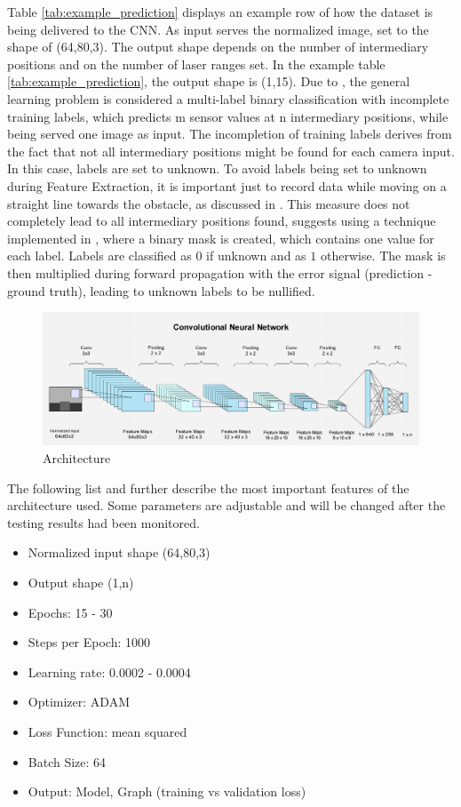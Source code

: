 Table \ref{tab:example_prediction} displays an example row of how the dataset is being delivered to the CNN. As input serves the normalized image, set to the shape of (64,80,3). The output shape depends on the number of intermediary positions and on the number of laser ranges set. In the example table \ref{tab:example_prediction}, the output shape is (1,15). Due to \cite{nava2019learning}, the general learning problem is considered a multi-label binary classification with incomplete training labels, which predicts m sensor values at n intermediary positions, while being served one image as input. The incompletion of training labels derives from the fact that not all intermediary positions might be found for each camera input. In this case, labels are set to unknown. To avoid labels being set to unknown during Feature Extraction, it is important just to record data while moving on a straight line towards the obstacle, as discussed in . This measure does not completely lead to all intermediary positions found, \cite{nava2019learning} suggests using a technique implemented in \cite{DBLP:journals/corr/EigenPF14}, where a binary mask is created, which contains one value for each label. Labels are classified as $0$ if unknown and as $1$ otherwise. The mask is then multiplied during forward propagation with the error signal (prediction - ground truth), leading to unknown labels to be nullified.

\begin{figure}[h]%
\centering
\includegraphics[width=1\textwidth]{Bilder/architecture.png} 
\caption[]{Architecture}
\label{architecture}
\end{figure}

The following list and  further describe the most important features of the architecture used. Some parameters are adjustable and will be changed after the testing results had been monitored.
\begin{itemize}
\item Normalized input shape (64,80,3)
\item Output shape (1,n)
\item Epochs: 15 - 30
\item Steps per Epoch: 1000
\item Learning rate: 0.0002 - 0.0004
\item Optimizer: ADAM
\item Loss Function: mean squared
\item Batch Size: 64
\item Output: Model, Graph (training vs validation loss)
\end{itemize}

